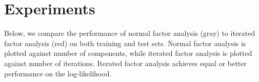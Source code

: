 \documentclass[12pt]{article}
\begin{document}
\section{Experiments}
Below, we compare the performance of normal factor analysis (gray) to iterated factor analysis (red) on both training and test sets. Normal factor analysis is plotted against number of components, while iterated factor analysis is plotted against number of iterations. Iterated factor analysis achieves equal or better performance on the log-likelihood. 
\begin{figure}[H]
	\centering
\end{figure}
\newpage
\end{document}
